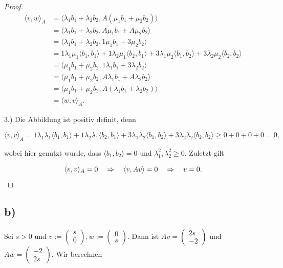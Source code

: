 \documentclass{article}
\begin{document}
\begin{proof}
    \[
    \begin{aligned}
        \langle v, w \rangle_A
           &=
        \langle \lambda_1 b_1 + \lambda_2 b_2,
        A(\mu_1 b_1 + \mu_2 b_2) \rangle
        \\ &=
        \langle \lambda_1 b_1 + \lambda_2 b_2,
        A\mu_1 b_1 + A\mu_2 b_2 \rangle
        \\ &=
        \langle \lambda_1 b_1 + \lambda_2 b_2,
        1\mu_1 b_1 + 3\mu_2 b_2 \rangle
        \\ &=
        1\lambda_1\mu_1\langle  b_1,
         b_1 \rangle
        +
        1\lambda_2\mu_1\langle  b_2,
         b_1 \rangle
        +
        3\lambda_1\mu_2\langle  b_1,
         b_2 \rangle
        +
        3\lambda_2\mu_2\langle  b_2,
         b_2 \rangle
        \\ &=
        \langle \mu_1 b_1 + \mu_2 b_2,
        1\lambda_1 b_1 + 3\lambda_2 b_2 \rangle
        \\ &=
        \langle \mu_1 b_1 + \mu_2 b_2,
        A\lambda_1 b_1 + A\lambda_2 b_2 \rangle
        \\ &=
        \langle \mu_1 b_1 + \mu_2 b_2,
        A(\lambda_1 b_1 + \lambda_2 b_2) \rangle
        \\ &=
        \langle w, v \rangle_A.
    \end{aligned}
    \]

    3.) Die Abbildung ist positiv definit, denn

    \[
        \langle v, v \rangle_A
        =
        1\lambda_1\lambda_1\langle  b_1,
         b_1 \rangle
        +
        1\lambda_2\lambda_1\langle  b_2,
         b_1 \rangle
        +
        3\lambda_1\lambda_2\langle  b_1,
         b_2 \rangle
        +
        3\lambda_2\lambda_2\langle  b_2,
         b_2 \rangle
        \geq
        0 + 0 + 0 + 0
        = 0,
    \]

    wobei hier genutzt wurde, dass 
    $\langle b_1, b_2 \rangle = 0$
    und $\lambda_1^2, \lambda_2^2 \geq 0$.
    Zuletzt gilt

    \[
    \langle v, v \rangle_A = 0
    \quad\Rightarrow \quad
    \langle v, Av \rangle = 0
    \quad\Rightarrow \quad
    v = 0 \qedhere.
    \]
 \end{proof}

\newpage

 \subsection*{b)}
 Sei
 $s > 0$
 und 
 $v := \begin{pmatrix}
    s \\ 0
 \end{pmatrix},
 w := \begin{pmatrix}
    0 \\ s
 \end{pmatrix}
 $.
 Dann ist
 $Av = \begin{pmatrix}
    2s \\ -2
 \end{pmatrix}$
 und
 $Aw = \begin{pmatrix}
    -2 \\ 2s 
 \end{pmatrix}$.
 Wir berechnen
\end{document}
